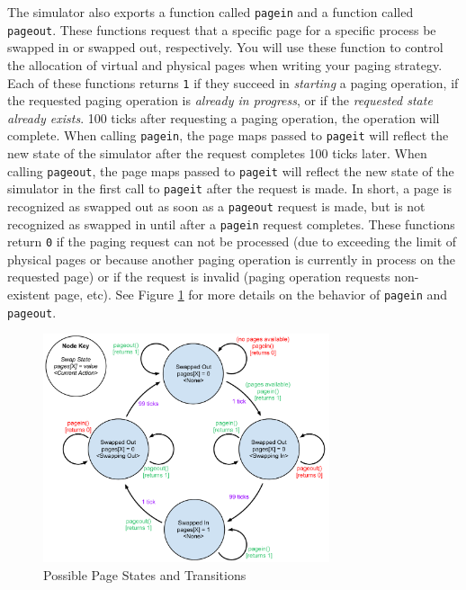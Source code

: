\documentclass[12pt]{article}
\begin{document}
The simulator also exports a function called \texttt{pagein} and a
function called \texttt{pageout}. These functions request that a
specific page for a specific process be swapped in or swapped out,
respectively. You will use these function to control the allocation of
virtual and physical pages when writing your paging strategy. Each of
these functions returns \texttt{1} if they succeed in \emph{starting} a
paging operation, if the requested paging operation is \emph{already in
  progress}, or if the \emph{requested state already exists}.
100 ticks after requesting a paging operation, the
operation will complete. When calling \texttt{pagein}, the page maps passed
to \texttt{pageit}
will reflect the new state of the simulator after the request
completes 100 ticks later. When calling \texttt{pageout}, the page maps passed
to \texttt{pageit}
will reflect the new state of the simulator in the first call to
\texttt{pageit} after the request is made.
In short, a page is recognized as swapped out as soon as a
\texttt{pageout} request is made, but is not recognized as swapped in
until after a \texttt{pagein} request completes.
These functions return
\texttt{0} if the paging request can not be processed (due to
exceeding the limit of physical pages or because another paging
operation is currently in process on the requested page) or if the
request is invalid (paging operation requests non-existent page,
etc). See Figure \ref{fig:pagestate} for more details on the behavior
of \texttt{pagein} and \texttt{pageout}.

\begin{figure}[htbp]
  \begin{center}
    \includegraphics[width=0.75\textwidth]{simulator-PageState.pdf}
    \caption{Possible Page States and Transitions}
    \label{fig:pagestate}
  \end{center}
\end{figure}
\end{document}
